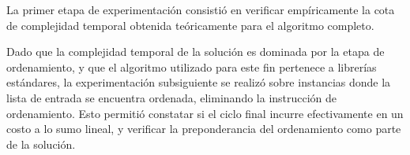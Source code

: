 La primer etapa de experimentación consistió en verificar empíricamente la cota de complejidad temporal obtenida teóricamente para el algoritmo completo.

Dado que la complejidad temporal de la solución es dominada por la etapa de ordenamiento, y que el algoritmo utilizado para este fin pertenece a librerías estándares, la experimentación subsiguiente se realizó sobre instancias donde la lista de entrada se encuentra ordenada, eliminando la instrucción de ordenamiento. Esto permitió constatar si el ciclo final incurre efectivamente en un costo a lo sumo lineal, y verificar la preponderancia del ordenamiento como parte de la solución.